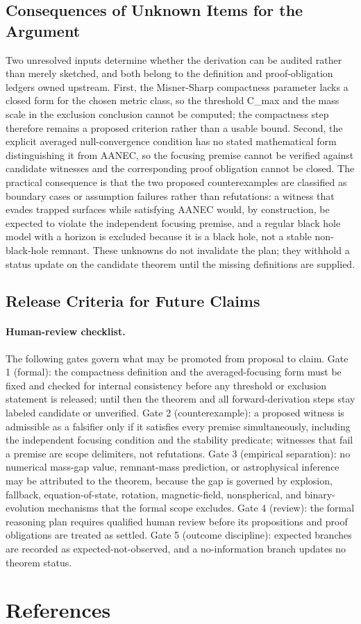 \documentclass[conference]{IEEEtran}
\begin{document}
\subsection{Consequences of Unknown Items for the Argument}
Two unresolved inputs determine whether the derivation can be audited rather than merely sketched, and both belong to the definition and proof-obligation ledgers owned upstream. First, the Misner-Sharp compactness parameter lacks a closed form for the chosen metric class, so the threshold C\_max and the mass scale in the exclusion conclusion cannot be computed; the compactness step therefore remains a proposed criterion rather than a usable bound. Second, the explicit averaged null-convergence condition has no stated mathematical form distinguishing it from AANEC, so the focusing premise cannot be verified against candidate witnesses and the corresponding proof obligation cannot be closed. The practical consequence is that the two proposed counterexamples are classified as boundary cases or assumption failures rather than refutations: a witness that evades trapped surfaces while satisfying AANEC would, by construction, be expected to violate the independent focusing premise, and a regular black hole model with a horizon is excluded because it is a black hole, not a stable non-black-hole remnant. These unknowns do not invalidate the plan; they withhold a status update on the candidate theorem until the missing definitions are supplied.

\subsection{Release Criteria for Future Claims}
\paragraph{Human-review checklist.} The following gates govern what may be promoted from proposal to claim. Gate 1 (formal): the compactness definition and the averaged-focusing form must be fixed and checked for internal consistency before any threshold or exclusion statement is released; until then the theorem and all forward-derivation steps stay labeled candidate or unverified. Gate 2 (counterexample): a proposed witness is admissible as a falsifier only if it satisfies every premise simultaneously, including the independent focusing condition and the stability predicate; witnesses that fail a premise are scope delimiters, not refutations. Gate 3 (empirical separation): no numerical mass-gap value, remnant-mass prediction, or astrophysical inference may be attributed to the theorem, because the gap is governed by explosion, fallback, equation-of-state, rotation, magnetic-field, nonspherical, and binary-evolution mechanisms that the formal scope excludes. Gate 4 (review): the formal reasoning plan requires qualified human review before its propositions and proof obligations are treated as settled. Gate 5 (outcome discipline): expected branches are recorded as expected-not-observed, and a no-information branch updates no theorem status.\section*{References}


\end{document}
